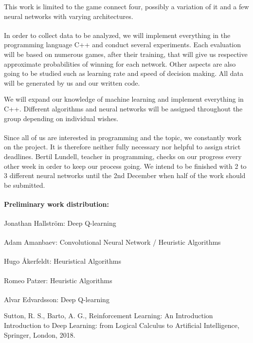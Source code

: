 \documentclass[titlepage]{article}
\begin{document}
This work is limited to the game connect four, possibly a variation of it and a few neural networks with varying architectures. \\\\
In order to collect data to be analyzed, we will implement everything in the programming language C++ and conduct several experiments.
Each evaluation will be based on numerous games, after their training, that will give us respective approximate probabilities of winning for each network.
Other aspects are also going to be studied such as learning rate and speed of decision making.
All data will be generated by us and our written code. 

\newpage
\noindent
We will expand our knowledge of machine learning and implement everything in C++.
Different algorithms and neural networks will be assigned throughout the group depending on individual wishes. \\\\
Since all of us are interested in programming and the topic, we constantly work on the project.
It is therefore neither fully necessary nor helpful to assign strict deadlines.
Bertil Lundell, teacher in programming, checks on our progress every other week in order to keep our process going.
We intend to be finished with 2 to 3 different neural networks until the 2nd December when half of the work should be submitted. \\\\
\textbf{Preliminary work distribution:} \\\\
Jonathan Hallström: Deep Q-learning \\\\
Adam Amanbaev: Convolutional Neural Network / Heuristic Algorithms \\\\
Hugo Åkerfeldt: Heuristical Algorithms \\\\
Romeo Patzer: Heuristic Algorithms \\\\
Alvar Edvardsson: Deep Q-learning 

\begin{thebibliography}{100}
Sutton, R. S., Barto, A. G., Reinforcement Learning: An Introduction
Introduction to Deep Learning: from Logical Calculus to Artificial Intelligence, Springer,
London, 2018.
\end{thebibliography}
\end{document}
